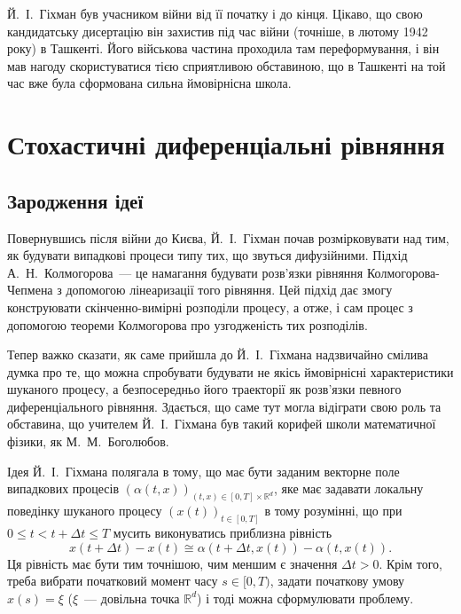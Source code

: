 \documentclass[11pt, reqno]{amsart}
\begin{document}
Й.~І.~Гіхман був учасником війни від її початку і до кінця. Цікаво, що свою кандидатську дисертацію він захистив під час війни (точніше, в лютому 1942 року) в Ташкенті. Його військова частина проходила там переформування, і він мав нагоду скористуватися тією сприятливою обставиною, що в Ташкенті на той час вже була сформована сильна ймовірнісна школа.

\section{Стохастичні диференціальні рівняння}

\subsection{Зародження ідеї}
Повернувшись після війни до Києва, Й.~І.~Гіхман  почав розмірковувати над тим, як будувати випадкові процеси типу тих, що звуться дифузійними. Підхід А.~Н.~Колмогорова~--- це намагання будувати розв'язки рівняння Колмогорова-Чепмена з допомогою лінеаризації того рівняння. Цей підхід дає змогу конструювати скінченно-вимірні розподіли процесу, а отже, і сам процес з допомогою теореми Колмогорова про узгодженість тих розподілів.

Тепер важко сказати, як саме прийшла до Й.~І.~Гіхмана надзвичайно смілива думка про те, що можна спробувати будувати не якісь ймовірнісні характеристики шуканого процесу, а безпосередньо його траекторії як розв'язки певного диференціального рівняння. Здається, що саме тут могла відіграти свою роль та обставина, що учителем Й.~І.~Гіхмана був такий корифей школи математичної фізики, як М.~М.~Боголюбов.

Ідея Й.~І.~Гіхмана полягала в тому, що має бути заданим векторне поле випадкових процесів $(\alpha(t,x))_{(t,x)\in[0,T]\times\mathbb{R}^d}$, яке має задавати локальну поведінку шуканого процесу $(x(t))_{t\in[0,T]}$ в тому розумінні, що при $0\le t<t+\Delta t\le T$ мусить виконуватись приблизна рівність
\[
x(t+\Delta t)-x(t)\cong\alpha(t+\Delta t,x(t))-\alpha(t,x(t)).
\]
Ця рівність має бути тим точнішою, чим меншим є значення $\Delta t>0$. Крім того, треба вибрати початковий момент часу $s\in[0,T)$, задати початкову умову $x(s)=\xi$ ($\xi$~--- довільна точка $\mathbb{R}^d$) і тоді можна сформулювати проблему.
\end{document}

